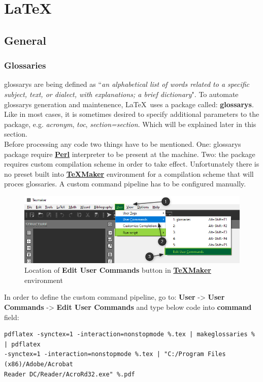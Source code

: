 \part{\LaTeX}

\chapter{General}

\section{Glossaries}

\Glspl{glossary} are being defined as ``\textit{an alphabetical list of words related to a specific subject, text, or dialect, with explanations; a brief dictionary}". To automate \glspl{glossary} generation and maintenence, \LaTeX\ uses a package called: \textbf{\glspl{glossary}}. Like in most cases, it is sometimes desired to specify additional \glspl{parameter} to the package, e.g. \textit{acronym}, \textit{toc}, \textit{section=section}. Which will be explained later in this section.\\

Before processing any code two things have to be mentioned. One: \glspl{glossary} package require \textbf{\href{https://www.perl.org/}{Perl}} interpreter to be present at the machine. Two: the package requires custom compilation scheme in order to take effect. Unfortunately there is no preset built into \textbf{\href{https://www.xm1math.net/texmaker/}{TeXMaker}} environment for a compilation scheme that will proces glossaries. A custom command \gls{pipeline} has to be configured manually.

\begin{figure}[H]
\centering
\includegraphics[scale=0.6]{content/LaTeX/figures/user_command_glossaries_marked.png}
\caption{Location of \textbf{Edit User Commands} button in \textbf{\href{https://www.xm1math.net/texmaker/}{TeXMaker}} environment}
\end{figure}

In order to define the custom command \gls{pipeline}, go to: \textbf{User} -> \textbf{User Commands} -> \textbf{Edit User Commands} and type below code into \textbf{command} field:
\begin{verbatim}
pdflatex -synctex=1 -interaction=nonstopmode %.tex | makeglossaries % | pdflatex 
-synctex=1 -interaction=nonstopmode %.tex | "C:/Program Files (x86)/Adobe/Acrobat
Reader DC/Reader/AcroRd32.exe" %.pdf
\end{verbatim}


